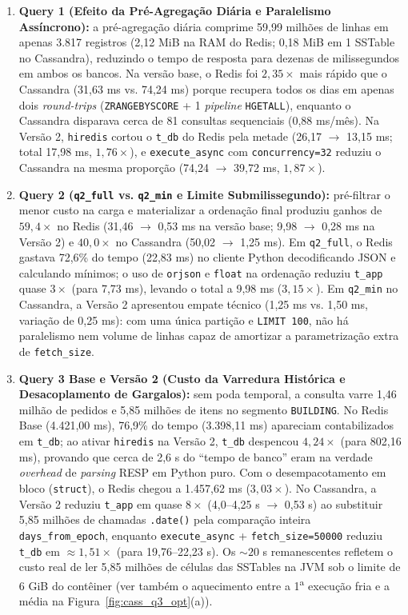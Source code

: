 \documentclass[12pt,a4paper]{article}
\begin{document}
\begin{enumerate}
    \item \textbf{Query 1 (Efeito da Pré-Agregação Diária e Paralelismo Assíncrono):} a pré-agregação diária comprime 59,99 milhões de linhas em apenas 3.817 registros (2,12 MiB na RAM do Redis; 0,18 MiB em 1 SSTable no Cassandra), reduzindo o tempo de resposta para dezenas de milissegundos em ambos os bancos. Na versão base, o Redis foi $2{,}35\times$ mais rápido que o Cassandra (31,63 ms vs. 74,24 ms) porque recupera todos os dias em apenas dois \textit{round-trips} (\texttt{ZRANGEBYSCORE} + 1 \textit{pipeline} \texttt{HGETALL}), enquanto o Cassandra disparava cerca de 81 consultas sequenciais (0,88 ms/mês). Na Versão 2, \texttt{hiredis} cortou o \texttt{t\_db} do Redis pela metade (26,17 $\rightarrow$ 13,15 ms; total 17,98 ms, $1{,}76\times$), e \texttt{execute\_async} com \texttt{concurrency=32} reduziu o Cassandra na mesma proporção (74,24 $\rightarrow$ 39,72 ms, $1{,}87\times$).

    \item \textbf{Query 2 (\texttt{q2\_full} vs. \texttt{q2\_min} e Limite Submilissegundo):} pré-filtrar o menor custo na carga e materializar a ordenação final produziu ganhos de $59{,}4\times$ no Redis (31,46 $\rightarrow$ 0,53 ms na versão base; 9,98 $\rightarrow$ 0,28 ms na Versão 2) e $40{,}0\times$ no Cassandra (50,02 $\rightarrow$ 1,25 ms). Em \texttt{q2\_full}, o Redis gastava 72,6\% do tempo (22,83 ms) no cliente Python decodificando JSON e calculando mínimos; o uso de \texttt{orjson} e \texttt{float} na ordenação reduziu \texttt{t\_app} quase $3\times$ (para 7,73 ms), levando o total a 9,98 ms ($3{,}15\times$). Em \texttt{q2\_min} no Cassandra, a Versão 2 apresentou empate técnico (1,25 ms vs. 1,50 ms, variação de 0,25 ms): com uma única partição e \texttt{LIMIT 100}, não há paralelismo nem volume de linhas capaz de amortizar a parametrização extra de \texttt{fetch\_size}.

    \item \textbf{Query 3 Base e Versão 2 (Custo da Varredura Histórica e Desacoplamento de Gargalos):} sem poda temporal, a consulta varre 1,46 milhão de pedidos e 5,85 milhões de itens no segmento \texttt{BUILDING}. No Redis Base (4.421,00 ms), 76,9\% do tempo (3.398,11 ms) apareciam contabilizados em \texttt{t\_db}; ao ativar \texttt{hiredis} na Versão 2, \texttt{t\_db} despencou $4{,}24\times$ (para 802,16 ms), provando que cerca de 2,6 s do ``tempo de banco'' eram na verdade \textit{overhead} de \textit{parsing} RESP em Python puro. Com o desempacotamento em bloco (\texttt{struct}), o Redis chegou a 1.457,62 ms ($3{,}03\times$). No Cassandra, a Versão 2 reduziu \texttt{t\_app} em quase $8\times$ (4,0--4,25 s $\rightarrow$ 0,53 s) ao substituir 5,85 milhões de chamadas \texttt{.date()} pela comparação inteira \texttt{days\_from\_epoch}, enquanto \texttt{execute\_async} + \texttt{fetch\_size=50000} reduziu \texttt{t\_db} em $\approx 1{,}51\times$ (para 19,76--22,23 s). Os $\sim 20$ s remanescentes refletem o custo real de ler 5,85 milhões de células das SSTables na JVM sob o limite de 6 GiB do contêiner (ver também o aquecimento entre a 1\textsuperscript{a} execução fria e a média na Figura~\ref{fig:cass_q3_opt}(a)).


\end{enumerate}
\end{document}
